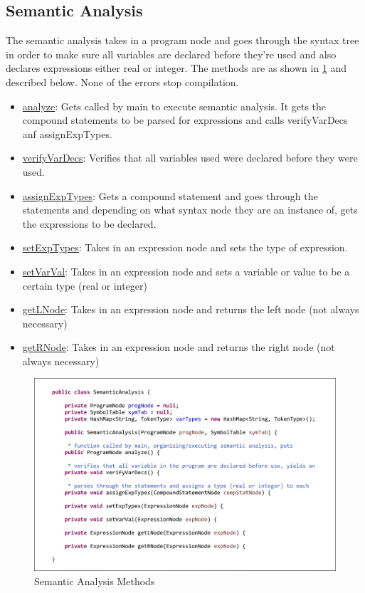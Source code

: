 \documentclass[english]{article}
\begin{document}
\subsection{Semantic Analysis}


The semantic analysis takes in a program node and goes through the syntax tree in order to make sure all variables are declared before they're used and also declares expressions either real or integer. The methods are as shown in \ref{Semantic} and described below. None of the errors stop compilation.

\begin{itemize}
\item
\underline{analyze}: Gets called by main to execute semantic analysis. It gets the compound statements  to be parsed for expressions and calls verifyVarDecs anf assignExpTypes. 
\item
\underline{verifyVarDecs}: Verifies that all variables used were declared before they were used.
\item
\underline{assignExpTypes}:  Gets a compound statement and goes through the statements and depending on what syntax node they are an instance of, gets the expressions to be declared.
\item
\underline{setExpTypes}: Takes in an expression node and sets the type of expression.
\item
\underline{setVarVal}: Takes in an expression node and sets a variable or value to be a certain type (real or integer)
\item
\underline{getLNode}: Takes in an expression node and returns the left node (not always necessary)
\item
\underline{getRNode}: Takes in an expression node and returns the right node (not always necessary)
\end{itemize}


\begin{figure}
\begin{center}
\includegraphics[width=1\textwidth]{semantic.PNG}
\end{center}
\caption{\label{Semantic}Semantic Analysis Methods}
\end{figure}
\end{document}
